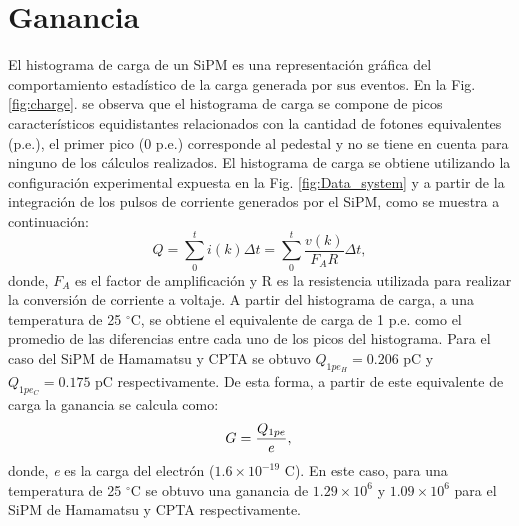 \section{Ganancia}
El histograma de carga de un SiPM es una representación gráfica del comportamiento estadístico de la carga generada por sus eventos. En la Fig. \ref{fig:charge}. se observa que el histograma de carga se compone de picos característicos equidistantes relacionados con la cantidad de fotones equivalentes (p.e.), el primer pico (0 p.e.) corresponde al pedestal y no se tiene en cuenta para ninguno de los cálculos realizados. El histograma de  carga se obtiene utilizando la configuración experimental expuesta en la Fig. \ref{fig:Data_system} y a partir de la integración de los pulsos de corriente generados por el SiPM, como se muestra a continuación:
\begin{equation}
Q = \displaystyle\sum_{0}^{t} i(k) \Delta  t = \displaystyle\sum_{0}^{t} \frac{v(k)}{F_A R} \Delta  t, 
\end{equation}
donde, $F_A$ es el factor de amplificación y R es la resistencia utilizada para realizar la conversión de corriente a voltaje. A partir del histograma de carga, a una temperatura de 25 $^\circ$C, se obtiene el equivalente de carga de 1 p.e. como el promedio de las diferencias entre cada uno de los picos del histograma. Para el caso del SiPM de Hamamatsu y CPTA se obtuvo $Q_{1pe_H}=0.206 $ pC y $Q_{1pe_C}=0.175 $ pC respectivamente. De esta forma, a partir de este equivalente de carga la ganancia se calcula como:
\begin{equation}
G = \frac{Q_{1pe}}{e},\\
\end{equation}
donde, \textit{e} es la carga del electrón ($1.6\times10^{-19}$ C). En este caso, para una temperatura de 25 $^\circ$C se obtuvo una ganancia de $1.29\times10^6$ y $1.09\times10^6$ para el SiPM de Hamamatsu y CPTA respectivamente.
